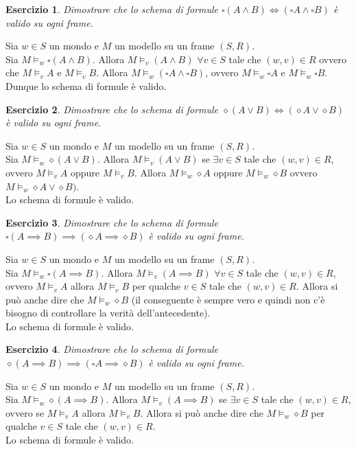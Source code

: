 \documentclass{article}
\theoremstyle{definition}
\theoremstyle{plain}
\theoremstyle{plain}
\theoremstyle{plain}
\theoremstyle{plain}
\newtheorem{esercizio}{Esercizio}
\begin{document}
\begin{esercizio}
    Dimostrare che lo schema di formule $\square (A \land B) \iff (\square A \land \square B)$ è valido su ogni frame.
\end{esercizio}
Sia $w \in S$ un mondo e $M$ un modello su un frame $(S, R)$. \\
Sia $M \models_w \square(A \land B)$. Allora $M \models_v (A \land B)$ $\forall v \in S$ tale che $(w, v) \in R$ ovvero che $M \models_v A$ e $M \models_v B$.
Allora $M \models_w (\square A \land \square B)$, ovvero $M \models_w \square A$ e $M \models_w \square B$. \\
Dunque lo schema di formule è valido.

\begin{esercizio}
    Dimostrare che lo schema di formule $\diamond (A \lor B) \iff (\diamond A \lor \diamond B)$ è valido su ogni frame.
\end{esercizio}
Sia $w \in S$ un mondo e $M$ un modello su un frame $(S, R)$. \\
Sia $M \models_w \diamond (A \lor B)$. Allora  $M \models_v (A \lor B)$ se $\exists v \in S$ tale che $(w, v) \in R$, ovvero  $M \models_v A$ oppure  $M \models_v B$. 
Allora $M \models_w \diamond A$ oppure $M \models_w \diamond B$ ovvero $M \models_w \diamond A \lor \diamond B)$. \\
Lo schema di formule è valido.

\begin{esercizio}
     Dimostrare che lo schema di formule $\square (A \implies B) \implies (\diamond A \implies \diamond B)$ è valido su ogni frame.
\end{esercizio}
Sia $w \in S$ un mondo e $M$ un modello su un frame $(S, R)$. \\
Sia $M \models_w \square (A \implies B)$. Allora $M \models_v (A \implies B)$ $\forall v \in S$ tale che $(w, v) \in R$, ovvero $M \models_v A$ allora $M \models_v B$ per qualche $ v \in S$ tale che $(w, v) \in R$. Allora si può anche dire che $M \models_w \diamond B$ (il conseguente è sempre vero e quindi non c'è bisogno di controllare la verità dell'antecedente). \\
Lo schema di formule è valido.

\begin{esercizio}
     Dimostrare che lo schema di formule $\diamond (A \implies B) \implies (\square A \implies \diamond B)$ è valido su ogni frame.
\end{esercizio}
Sia $w \in S$ un mondo e $M$ un modello su un frame $(S, R)$. \\
Sia $M \models_w \diamond (A \implies B)$. Allora $M \models_v (A \implies B)$ se $\exists v \in S$ tale che $(w, v) \in R$, ovvero se $M \models_v A$ allora $M \models_v B$. Allora si può anche dire che $M \models_w \diamond B$ per qualche $v \in S$ tale che $(w, v) \in R$. \\
Lo schema di formule è valido.
\end{document}

